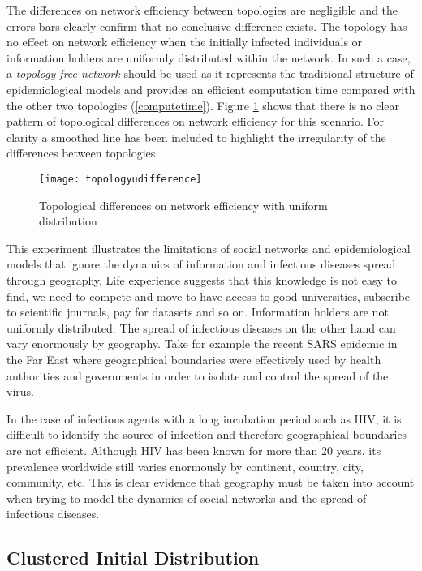 The differences on network efficiency between topologies are negligible and the errors
bars clearly confirm that no conclusive difference exists. The topology has no effect on
network efficiency when the initially infected individuals or information holders are
uniformly distributed within the network. In such a case, a \emph{topology free network}
should be used as it represents the traditional structure of epidemiological models and
provides an efficient computation time compared with the other two topologies
(\ref{computetime}). Figure \ref{topologyudifference} shows that there is no clear
pattern of topological differences on network efficiency for this scenario. For clarity a
smoothed line has been included to highlight the irregularity of the differences between
topologies.
\begin{figure}[h]
\texttt{[image: topologyudifference]}
\caption{Topological differences on network efficiency with uniform distribution}
\label{topologyudifference}
\end{figure}

This experiment illustrates the limitations of social networks and epidemiological models
that ignore the dynamics of information and infectious diseases spread through geography.
Life experience suggests that this knowledge is not easy to find, we need to compete and
move to have access to good universities, subscribe to scientific journals, pay for
datasets and so on. Information holders are not uniformly distributed. The spread of
infectious diseases on the other hand can vary enormously by geography. Take for example
the recent SARS epidemic in the Far East where geographical boundaries were effectively
used by health authorities and governments in order to isolate and control the spread of
the virus.

\newpage
In the case of infectious agents with a long incubation period such as HIV, it is
difficult to identify the source of infection and therefore geographical boundaries are
not efficient. Although HIV has been known for more than 20 years, its prevalence
worldwide still varies enormously by continent, country, city, community, etc.  This is
clear evidence that geography must be taken into account when trying to model the
dynamics of social networks and the spread of infectious diseases.


\subsection{Clustered Initial Distribution}

